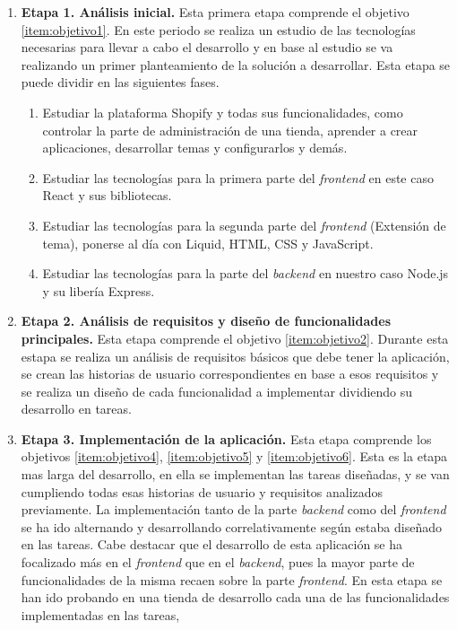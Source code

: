 \documentclass[12pt]{article}
\begin{document}
\begin{enumerate}[label={\textbf{\textbullet}}]
    \item \textbf{Etapa 1. Análisis inicial.} Esta primera etapa comprende el objetivo \ref{item:objetivo1}. En este periodo se realiza un estudio de las tecnologías
    necesarias para llevar a cabo el desarrollo y en base al estudio se va realizando un primer planteamiento de la solución a desarrollar. Esta etapa se puede dividir en las siguientes fases.
    \begin{enumerate}
        \item Estudiar la plataforma Shopify y todas sus funcionalidades, como controlar la parte de administración de una tienda, aprender a crear aplicaciones, desarrollar temas y configurarlos y demás.
        \item Estudiar las tecnologías para la primera parte del \textit{frontend} en este caso React y sus bibliotecas.
        \item Estudiar las tecnologías para la segunda parte del \textit{frontend} (Extensión de tema), ponerse al día con Liquid, HTML, CSS y JavaScript.
        \item Estudiar las tecnologías para la parte del \textit{backend} en nuestro caso Node.js y su libería Express. 
    \end{enumerate}
    \item \textbf{Etapa 2. Análisis de requisitos y diseño de funcionalidades principales.} Esta etapa comprende el objetivo \ref{item:objetivo2}.
    Durante esta estapa se realiza un análisis de requisitos básicos que debe tener la aplicación, se crean las historias de usuario correspondientes en base a esos requisitos y se realiza un diseño de cada
    funcionalidad a implementar dividiendo su desarrollo en tareas.
    \item \textbf{Etapa 3. Implementación de la aplicación.} Esta etapa comprende los objetivos \ref{item:objetivo4}, \ref{item:objetivo5} y \ref{item:objetivo6}.
    Esta es la etapa mas larga del desarrollo, en ella se implementan las tareas diseñadas, y se van cumpliendo todas esas historias de usuario y requisitos analizados previamente.
    La implementación tanto de la parte \textit{backend} como del \textit{frontend} se ha ido alternando y desarrollando correlativamente según estaba diseñado en las tareas. Cabe destacar que el desarrollo de esta aplicación se ha focalizado
    más en el \textit{frontend} que en el \textit{backend}, pues la mayor parte de funcionalidades de la misma recaen sobre la parte \textit{frontend}. En esta etapa se han ido probando en una tienda de desarrollo cada una de las funcionalidades implementadas en las tareas, 

\end{enumerate}
\end{document}
